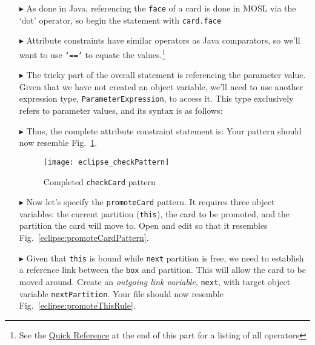 \begin{itemize}
\item[$\blacktriangleright$] As done in Java, referencing the \texttt{face} of a card is done in MOSL via the `dot' operator, so begin the statement with
\texttt{card.face}

\item[$\blacktriangleright$] Attribute constraints have similar operators as Java comparators, so we'll want to use \texttt{`=='} to equate the
values.\footnote{See the \hyperlink{quickRef}{Quick Reference} at the end of this part for a listing of all operators}

\item[$\blacktriangleright$] The tricky part of the overall statement is referencing the parameter value. Given that we have not created an object variable,
we'll need to use another expression type, \texttt{ParameterExpression}, to access it. This type exclusively refers to parameter
values, and its syntax is as follows:

\item[$\blacktriangleright$] Thus, the complete attribute constraint statement is:  Your pattern should now resemble
Fig.~\ref{eclipse:checkPattern}.

\vspace{0.5cm}

\begin{figure}[htbp]
\begin{center}
  \texttt{[image: eclipse\_checkPattern]}
  \caption{Completed \texttt{checkCard} pattern}
  \label{eclipse:checkPattern}
\end{center}
\end{figure} 

\item[$\blacktriangleright$] Now let's specify the \texttt{promoteCard} pattern. It requires three object variables: the current partition (\texttt{this}),
the card to be promoted, and the partition the card will move to. Open and edit so that it resembles Fig.~\ref{eclipse:promoteCardPattern}.

\item[$\blacktriangleright$] Given that \texttt{this} is bound while \texttt{next} partition is free, we need to establish a reference link between the
\texttt{box} and partition. This will allow the card to be moved around. Create an \emph{outgoing link variable}, \texttt{next},  with target object variable
\texttt{nextPartition}. Your file should now resemble Fig.~\ref{eclipse:promoteThisRule}.


\end{itemize}
